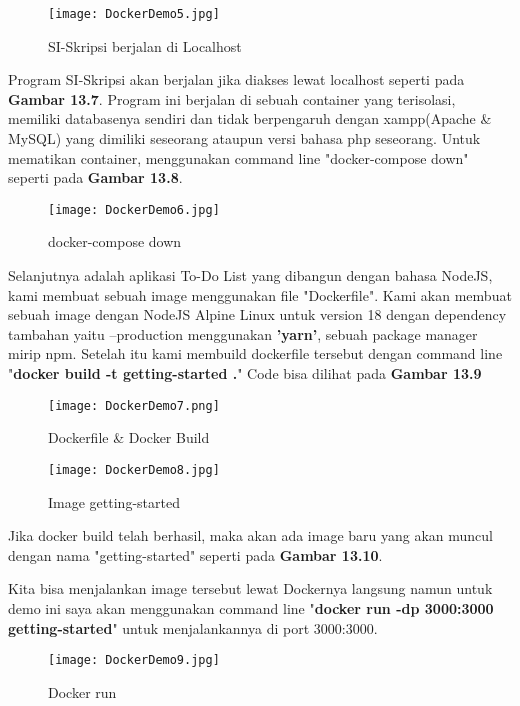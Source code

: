 \begin{figure}[h]
	\centering
	\texttt{[image: DockerDemo5.jpg]}
	\caption{SI-Skripsi berjalan di Localhost}
	\label{fig:DockerDemo5}
\end{figure}

Program SI-Skripsi akan berjalan jika diakses lewat localhost seperti pada \textbf{Gambar 13.7}. Program ini berjalan di sebuah container yang terisolasi, memiliki databasenya sendiri dan tidak berpengaruh dengan xampp(Apache \& MySQL) yang dimiliki seseorang ataupun versi bahasa php seseorang. Untuk mematikan container, menggunakan command line "docker-compose down" seperti pada \textbf{Gambar 13.8}.

\begin{figure}[h]
	\centering
	\texttt{[image: DockerDemo6.jpg]}
	\caption{docker-compose down}
	\label{fig:DockerDemo6}
\end{figure}

Selanjutnya adalah aplikasi To-Do List yang dibangun dengan bahasa NodeJS, kami membuat sebuah image menggunakan file "Dockerfile". Kami akan membuat sebuah image dengan NodeJS Alpine Linux untuk version 18 dengan dependency tambahan yaitu --production menggunakan \textbf{'yarn'}, sebuah package manager mirip npm. Setelah itu kami membuild dockerfile tersebut dengan command line "\textbf{docker build -t getting-started .}" Code bisa dilihat pada \textbf{Gambar 13.9}

\begin{figure}[h]
	\centering
	\texttt{[image: DockerDemo7.png]}
	\caption{Dockerfile \& Docker Build}
	\label{fig:DockerDemo7}
\end{figure}

\begin{figure}[h!]
	\centering
	\texttt{[image: DockerDemo8.jpg]}
	\caption{Image getting-started}
	\label{fig:DockerDemo8}
\end{figure}

Jika docker build telah berhasil, maka akan ada image baru yang akan muncul dengan nama "getting-started" seperti pada \textbf{Gambar 13.10}.

Kita bisa menjalankan image tersebut lewat Dockernya langsung namun untuk demo ini saya akan menggunakan command line "\textbf{docker run -dp 3000:3000 getting-started}" untuk menjalankannya di port 3000:3000.

\begin{figure}[h]
	\centering
	\texttt{[image: DockerDemo9.jpg]}
	\caption{Docker run}
	\label{fig:DockerDemo9}
\end{figure}


